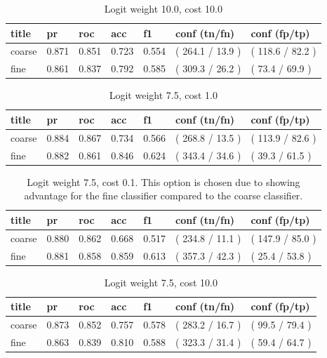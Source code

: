 \documentclass[ms]{nuthesis}
\begin{document}
\FloatBarrier
\begin{table}[H]
\centering
\caption{Logit weight 10.0, cost 10.0}
\label{tab:LogRegWt10-C10}
\begin{tabular}{|l||l||l||l||l||l||l|}\toprule
title & pr & roc & acc & f1 & conf (tn/fn) & conf (fp/tp) \\ \midrule
coarse & 0.871 & 0.851 & 0.723 & 0.554 & ( 264.1 / 13.9 ) & ( 118.6 / 82.2 ) \\
fine & 0.861 & 0.837 & 0.792 & 0.585 & ( 309.3 / 26.2 ) & ( 73.4 / 69.9 ) \\ \bottomrule
\end{tabular}
\end{table}
\FloatBarrier

\FloatBarrier
\begin{table}[H]
\centering
\caption{Logit weight 7.5, cost 1.0}
\label{tab:LogRegWt7p5-C1}
\begin{tabular}{|l||l||l||l||l||l||l|}\toprule
title & pr & roc & acc & f1 & conf (tn/fn) & conf (fp/tp) \\ \midrule
coarse & 0.884 & 0.867 & 0.734 & 0.566 & ( 268.8 / 13.5 ) & ( 113.9 / 82.6 ) \\
fine & 0.882 & 0.861 & 0.846 & 0.624 & ( 343.4 / 34.6 ) & ( 39.3 / 61.5 ) \\ \bottomrule
\end{tabular}
\end{table}
\FloatBarrier

\FloatBarrier
\begin{table}[H]
\centering
\caption{Logit weight 7.5, cost 0.1. This option is chosen due to showing advantage for the
fine classifier compared to the coarse classifier.}
\label{tab:LogRegWt7p5-Cp1}
\begin{tabular}{|l||l||l||l||l||l||l|}\toprule
title & pr & roc & acc & f1 & conf (tn/fn) & conf (fp/tp) \\ \midrule
coarse & 0.880 & 0.862 & 0.668 & 0.517 & ( 234.8 / 11.1 ) & ( 147.9 / 85.0 ) \\
fine & 0.881 & 0.858 & 0.859 & 0.613 & ( 357.3 / 42.3 ) & ( 25.4 / 53.8 ) \\ \bottomrule
\end{tabular}
\end{table}
\FloatBarrier

\FloatBarrier
\begin{table}[H]
\centering
\caption{Logit weight 7.5, cost 10.0}
\label{tab:LogRegWt7p5-C10}
\begin{tabular}{|l||l||l||l||l||l||l|}\toprule
title & pr & roc & acc & f1 & conf (tn/fn) & conf (fp/tp) \\ \midrule
coarse & 0.873 & 0.852 & 0.757 & 0.578 & ( 283.2 / 16.7 ) & ( 99.5 / 79.4 ) \\
fine & 0.863 & 0.839 & 0.810 & 0.588 & ( 323.3 / 31.4 ) & ( 59.4 / 64.7 ) \\ \bottomrule
\end{tabular}
\end{table}
\FloatBarrier
\end{document}
